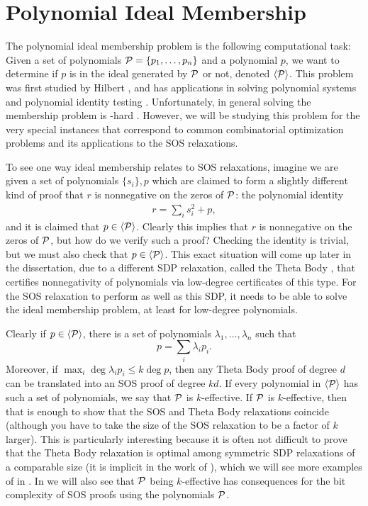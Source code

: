 \section{Polynomial Ideal Membership}

The polynomial ideal membership problem is the following computational task:
Given a set of polynomials $\mathcal P = \{p_1,\dots,p_n\}$ and a polynomial $p$, we want to determine if $p$ is in the ideal generated by $\mathcal P$ or not, denoted $\langle \mathcal P \rangle$. 
This problem was first studied by Hilbert \cite{Hilbert1893}, and has applications in solving polynomial systems \cite{CLO07} and polynomial identity testing \cite{AM10}.
Unfortunately, in general solving the membership problem is \expspace-hard \cite{MM82,Huynh1985}. 
However, we will be studying this problem for the very special instances that correspond to common combinatorial optimization problems and its applications to the SOS relaxations. 

To see one way ideal membership relates to SOS relaxations, imagine we are given a set of polynomials $\{s_i\}, p$ which are claimed to form a slightly different kind of proof that $r$ is nonnegative on the zeros of $\mathcal P$: the polynomial identity
\begin{align}
r = \sum_i s_i^2 + p,
\end{align}
and it is claimed that $p \in \langle \mathcal P \rangle$. Clearly this implies that $r$ is nonnegative on the zeros of $\mathcal P$, but how do we verify such a proof? Checking the identity is trivial, but we must also check that $p \in \langle \mathcal P \rangle$.  
This exact situation will come up later in the dissertation, due to a different SDP relaxation, called the Theta Body \cite{GPT10}, that certifies nonnegativity of polynomials via low-degree certificates of this type. 
For the SOS relaxation to perform as well as this SDP, it needs to be able to solve the ideal membership problem, at least for low-degree polynomials. 

Clearly if $p \in \langle \mathcal P \rangle$, there is a set of polynomials $\lambda_1, \dots, \lambda_n$ such that 
\[p = \sum_i \lambda_i p_i.\]
Moreover, if $\max_i \deg \lambda_ip_i \leq k\deg p$, then any Theta Body proof of degree $d$ can be translated into an SOS proof of degree $kd$. 
If every polynomial in $\langle \mathcal P \rangle$ has such a set of polynomials, we say that $\mathcal P$ is $k$-effective. 
If $\mathcal P$ is $k$-effective, then that is enough to show that the SOS and Theta Body relaxations coincide (although you have to take the size of the SOS relaxation to be a factor of $k$ larger). 
This is particularly interesting because it is often not difficult to prove that the Theta Body relaxation is optimal among symmetric SDP relaxations of a comparable size (it is implicit in the work of \cite{LRST14}), which we will see more examples of in . In  we will also see that $\mathcal P$ being $k$-effective has consequences for the bit complexity of SOS proofs using the polynomials $\mathcal P$.

